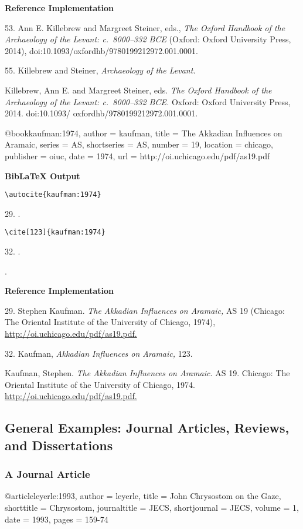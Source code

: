 \documentclass[a4paper]{article}
\newcommand\citetestnpf[4]{%
  {\textbf{BibLaTeX Output}\par
   \nobreak
   \texttt{\textbackslash autocite\{#4\}}\par
   \color{biblatex-colour}
   #1. \cite{#4}.\par
   \color{black}
   \texttt{\textbackslash cite[#3]\{#4\}}\par
   \color{biblatex-colour}
   #2. \cite[#3]{#4}.\par
   \hangindent\bibindent\bibentrycite{#4}.\par}}
\newenvironment{refimp}{%
  \begin{minipage}{\linewidth}
    \setlength{\parskip}{1ex}
    \textbf{Reference Implementation}\par
    \nobreak
    \color{reference-colour}
}{\end{minipage}}
\newenvironment{vb}{%
  \setlength{\parskip}{0pt}
  \verbatim}{\endverbatim}
\begin{document}
\begin{refimp}
  53. Ann E. Killebrew and Margreet Steiner, eds., \emph{The Oxford Handbook
  of the Archaeology of the Levant: c.~8000–332 BCE} (Oxford: Oxford
  University Press, 2014), doi:10.1093/oxfordhb/9780199212972.001.0001.

  55. Killebrew and Steiner, \emph{Archaeology of the Levant.}

  \hangindent\bibindent Killebrew, Ann E. and Margreet Steiner, eds. \emph{The
  Oxford Handbook of the Archaeology of the Levant: c.~8000–332 BCE.} Oxford:
  Oxford University Press, 2014. doi:10.1093/ oxfordhb/9780199212972.001.0001.
\end{refimp}

\begin{vb}
@book{kaufman:1974,
  author = kaufman,
  title = {The Akkadian Influences on Aramaic},
  series = AS,
  shortseries = {AS},
  number = {19},
  location = chicago,
  publisher = oiuc,
  date = {1974},
  url = {http://oi.uchicago.edu/pdf/as19.pdf}
}
\end{vb}

\citetestnpf{29}{32}{123}{kaufman:1974}

\begin{refimp}
  29. Stephen Kaufman. \emph{The Akkadian Influences on Aramaic,} AS 19
  (Chicago: The Oriental Institute of the University of Chicago, 1974),
  \url{http://oi.uchicago.edu/pdf/as19.pdf.}

  32. Kaufman, \emph{Akkadian Influences on Aramaic,} 123.

  \hangindent\bibindent Kaufman, Stephen. \emph{The Akkadian Influences on
  Aramaic.} AS 19. Chicago: The Oriental Institute of the University of
  Chicago, 1974. \url{http://oi.uchicago.edu/pdf/as19.pdf.}
\end{refimp}

\subsection{General Examples: Journal Articles, Reviews, and Dissertations}

\subsubsection{A Journal Article}

\begin{vb}
@article{leyerle:1993,
  author = leyerle,
  title = {John Chrysostom on the Gaze},
  shorttitle = {Chrysostom},
  journaltitle = JECS,
  shortjournal = {JECS},
  volume = {1},
  date = {1993},
  pages = {159-74}
}
\end{vb}  
\end{document}
